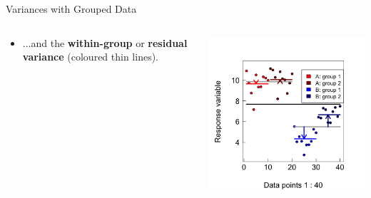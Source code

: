 \documentclass{beamer}
\begin{document}
\begin{frame}{Variances with Grouped Data}

\begin{columns}[onlytextwidth] 
    \begin{column}{0.54\textwidth}
  \begin{itemize}
    \item ...and the \textbf{within-group} or \textbf{residual variance} (coloured thin lines).
  \end{itemize}    \end{column}
    \hspace{0.02\textwidth} %
    \begin{column}{0.46\textwidth}
      \begin{center}
        \includegraphics[width=0.999\textwidth]{lectures/day_1_intro_to_mems/figures/unnamed-chunk-25-1.png}
      \end{center}
    \end{column}
  \end{columns}
  
\end{frame}
\end{document}
